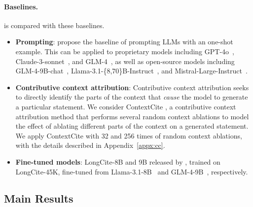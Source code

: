 \paragraph{Baselines.} \ours is compared with these baselines.
\begin{itemize}
    \item \textbf{Prompting}: \citet{zhang2024longcite} propose the baseline of prompting LLMs with an one-shot example. This can be applied to proprietary models including GPT-4o~\citep{openai2023gpt4}, Claude-3-sonnet~\citep{claude-3}, and GLM-4~\citep{glm2024chatglm}, as well as open-source models including GLM-4-9B-chat~\citep{glm2024chatglm}, Llama-3.1-\{8,70\}B-Instruct~\citep{dubey2024llama}, and Mistral-Large-Instruct~\citep{mistral}.
    \item \textbf{Contributive context attribution}: 
    Contributive context attribution seeks to directly identify the parts of the context that \emph{cause} the model to generate a particular statement.
    We consider ContextCite \citep{cohen2024contextcite}, a contributive context attribution method that performs several random context ablations to model the effect of ablating different parts of the context on a generated statement.
    We apply ContextCite with 32 and 256 times of random context ablations, with the details described in Appendix~\ref{appx:cc}.
    \item \textbf{Fine-tuned models}: LongCite-8B and 9B released by \citet{zhang2024longcite}, trained on LongCite-45K, fine-tuned from Llama-3.1-8B~\citep{dubey2024llama} and GLM-4-9B~\citep{glm2024chatglm}, respectively.
\end{itemize}



\subsection{Main Results}

